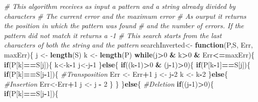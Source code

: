 \documentclass[]{article}
\newenvironment{Shaded}{\begin{snugshade}}{\end{snugshade}}
\newcommand{\KeywordTok}[1]{\textcolor[rgb]{0.13,0.29,0.53}{\textbf{#1}}}
\newcommand{\DecValTok}[1]{\textcolor[rgb]{0.00,0.00,0.81}{#1}}
\newcommand{\StringTok}[1]{\textcolor[rgb]{0.31,0.60,0.02}{#1}}
\newcommand{\CommentTok}[1]{\textcolor[rgb]{0.56,0.35,0.01}{\textit{#1}}}
\newcommand{\ControlFlowTok}[1]{\textcolor[rgb]{0.13,0.29,0.53}{\textbf{#1}}}
\newcommand{\OperatorTok}[1]{\textcolor[rgb]{0.81,0.36,0.00}{\textbf{#1}}}
\newcommand{\NormalTok}[1]{#1}
\begin{document}
\begin{Shaded}
\begin{Highlighting}[]
\CommentTok{# This algorithm receives as input a pattern and a string already divided by characters}
\CommentTok{# The current error and the maximum error}
\CommentTok{# As ourput it returns the position in which the pattern was found}
\CommentTok{# and the number of errors. If the pattern did not match it returns a -1}
\CommentTok{# This search starts from the last characters of both the string and the pattern}
\NormalTok{searchInverted<-}\StringTok{ }\ControlFlowTok{function}\NormalTok{(P,S, Err, maxErr)\{}
\NormalTok{  j   <-}\StringTok{ }\KeywordTok{length}\NormalTok{(S)}
\NormalTok{  k   <-}\StringTok{ }\KeywordTok{length}\NormalTok{(P)}
  \ControlFlowTok{while}\NormalTok{(j}\OperatorTok{>}\DecValTok{0} \OperatorTok{&}\StringTok{ }\NormalTok{k}\OperatorTok{>}\DecValTok{0} \OperatorTok{&}\StringTok{ }\NormalTok{Err}\OperatorTok{<=}\NormalTok{maxErr)\{}
    \ControlFlowTok{if}\NormalTok{(P[k]}\OperatorTok{==}\NormalTok{S[j])\{}
\NormalTok{      k<-k}\OperatorTok{-}\DecValTok{1}
\NormalTok{      j<-j}\OperatorTok{-}\DecValTok{1}
\NormalTok{    \}}\ControlFlowTok{else}\NormalTok{\{}
      \ControlFlowTok{if}\NormalTok{((k}\OperatorTok{-}\DecValTok{1}\NormalTok{)}\OperatorTok{>}\DecValTok{0} \OperatorTok{&}\StringTok{ }\NormalTok{(j}\OperatorTok{-}\DecValTok{1}\NormalTok{)}\OperatorTok{>}\DecValTok{0}\NormalTok{)\{}
        \ControlFlowTok{if}\NormalTok{(P[k}\OperatorTok{-}\DecValTok{1}\NormalTok{]}\OperatorTok{==}\NormalTok{S[j])\{}
          \ControlFlowTok{if}\NormalTok{(P[k]}\OperatorTok{==}\NormalTok{S[j}\OperatorTok{-}\DecValTok{1}\NormalTok{])\{}
            \CommentTok{#Transposition}
\NormalTok{            Err <-}\StringTok{ }\NormalTok{Err}\OperatorTok{+}\DecValTok{1}
\NormalTok{            j   <-}\StringTok{ }\NormalTok{j}\OperatorTok{-}\DecValTok{2}
\NormalTok{            k   <-}\StringTok{ }\NormalTok{k}\OperatorTok{-}\DecValTok{2}
\NormalTok{          \}}\ControlFlowTok{else}\NormalTok{\{}
            \CommentTok{#Insertion}
\NormalTok{            Err<-Err}\OperatorTok{+}\DecValTok{1}
\NormalTok{            j <-}\StringTok{ }\NormalTok{j }\OperatorTok{-}\StringTok{ }\DecValTok{2}
\NormalTok{          \}}
\NormalTok{        \}}
\NormalTok{      \}}\ControlFlowTok{else}\NormalTok{\{}
        \CommentTok{#Deletion}
        \ControlFlowTok{if}\NormalTok{((j}\OperatorTok{-}\DecValTok{1}\NormalTok{)}\OperatorTok{>}\DecValTok{0}\NormalTok{)\{}
          \ControlFlowTok{if}\NormalTok{(P[k]}\OperatorTok{==}\NormalTok{S[j}\OperatorTok{-}\DecValTok{1}\NormalTok{])\{}

\end{Highlighting}
\end{Shaded}
\end{document}
